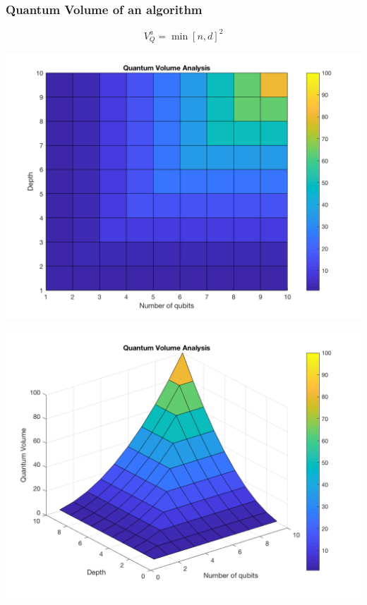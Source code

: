 \documentclass[11pt]{article}
\begin{document}
\subsubsection{Quantum Volume of an algorithm}
\label{sec:orge00afb4}

$$V_Q^a = \min \left[ n,d \right]^2$$


\begin{minipage}{.45\textwidth}

\centering

\begin{center}
\includegraphics[width=.9\linewidth]{V_q_analysis2.png}
\end{center} 

\label{fig:algorithmQV2}

\end{minipage}%
\hspace{1cm}
\begin{minipage}{.45\textwidth}

\begin{center}
\includegraphics[width=.9\linewidth]{V_q_analysis1.png}
\end{center} 

\label{fig:algorithmQV1}

\end{minipage}%
\end{document}
